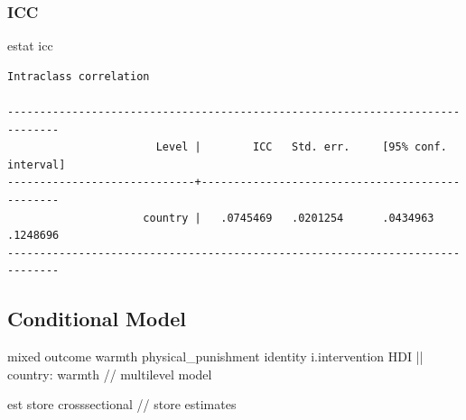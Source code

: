 \documentclass[
  letterpaper,
  DIV=11,
  numbers=noendperiod]{scrreprt}
\newenvironment{Shaded}{\begin{snugshade}}{\end{snugshade}}
\newcommand{\CommentTok}[1]{\textcolor[rgb]{0.37,0.37,0.37}{#1}}
\newcommand{\KeywordTok}[1]{\textcolor[rgb]{0.00,0.23,0.31}{#1}}
\newcommand{\NormalTok}[1]{\textcolor[rgb]{0.00,0.23,0.31}{#1}}
\begin{document}
\subsubsection{ICC}\label{icc}

\begin{Shaded}
\begin{Highlighting}[]

\KeywordTok{estat}\NormalTok{ icc}
\end{Highlighting}
\end{Shaded}

\begin{verbatim}
Intraclass correlation

------------------------------------------------------------------------------
                       Level |        ICC   Std. err.     [95% conf. interval]
-----------------------------+------------------------------------------------
                     country |   .0745469   .0201254      .0434963    .1248696
------------------------------------------------------------------------------
\end{verbatim}

\subsection{Conditional Model}\label{conditional-model}

\begin{Shaded}
\begin{Highlighting}[]

\NormalTok{mixed outcome warmth physical\_punishment }\KeywordTok{identity}\NormalTok{ i.intervention HDI || country: warmth }\CommentTok{// multilevel model}

\KeywordTok{est} \KeywordTok{store}\NormalTok{ crosssectional }\CommentTok{// store estimates}
\end{Highlighting}
\end{Shaded}
\end{document}
